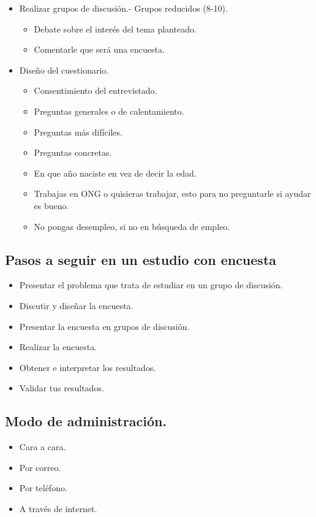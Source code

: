 \begin{itemize}
    \item Realizar grupos de discusión.- Grupos reducidos (8-10).
    \begin{itemize}
	\item Debate sobre el interés del tema planteado.
	\item Comentarle que será una encuesta.
    \end{itemize}
    \item Diseño del cuestionario.
    \begin{itemize}
	\item Consentimiento del entrevistado.
	\item Preguntas generales o de calentamiento.
	\item Preguntas más difíciles.
	\item Preguntas concretas.
	\item En que año naciste en vez de decir la edad.
	\item Trabajas en ONG o quisieras trabajar, esto para no preguntarle si ayudar es bueno.
	\item No pongas desempleo, si no en búsqueda de empleo.
    \end{itemize}
\end{itemize}

\subsection{Pasos a seguir en un estudio con encuesta}
\begin{itemize}
    \item Presentar el problema que trata de estudiar en un grupo de discusión.
    \item Discutir y diseñar la encuesta.
    \item Presentar la encuesta en grupos de discusión.
    \item Realizar la encuesta.
    \item Obtener e interpretar los resultados.
    \item Validar tus resultados.
\end{itemize}


\subsection{Modo de administración.}

\begin{itemize}
    \item Cara a cara.
    \item Por correo.
    \item Por teléfono.
    \item A través de internet.
\end{itemize}

